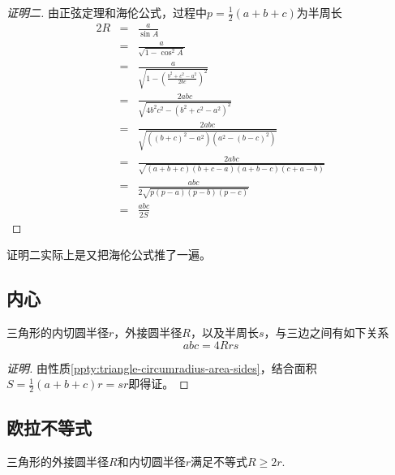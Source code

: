\begin{proof}[证明二]
  由正弦定理和海伦公式，过程中$p=\frac{1}{2}(a+b+c)$为半周长
  \begin{eqnarray*}
    2R & = & \frac{a}{\sin{A}} \\
       & = & \frac{a}{\sqrt{1-\cos^2{A}}} \\
       & = & \frac{a}{\sqrt{1-\left( \frac{b^2+c^2-a^2}{2bc} \right)^2}} \\
       & = & \frac{2abc}{\sqrt{4b^2c^2-(b^2+c^2-a^2)^2}} \\
       & = & \frac{2abc}{\sqrt{((b+c)^2-a^2)(a^2-(b-c)^2)}} \\
       & = & \frac{2abc}{\sqrt{(a+b+c)(b+c-a)(a+b-c)(c+a-b)}} \\
       & = & \frac{abc}{2 \sqrt{p(p-a)(p-b)(p-c)}} \\
    & = & \frac{abc}{2S}
  \end{eqnarray*}
\end{proof}
证明二实际上是又把海伦公式推了一遍。


\subsection{内心}
\label{sec:triangle-incenter}

\begin{property}
  三角形的内切圆半径$r$，外接圆半径$R$，以及半周长$s$，与三边之间有如下关系
  \begin{equation}
    \label{eq:triangle-abc-equal-4Rrs}
    abc = 4Rrs
  \end{equation}
\end{property}

\begin{proof}[证明]
 由性质\ref{ppty:triangle-circumradius-area-sides}，结合面积$S=\frac{1}{2}(a+b+c)r=sr$即得证。
\end{proof}

\subsection{欧拉不等式}
\label{sec:euler-inequality}

\begin{theorem}
  三角形的外接圆半径$R$和内切圆半径$r$满足不等式$R \geqslant 2r$.
\end{theorem}

